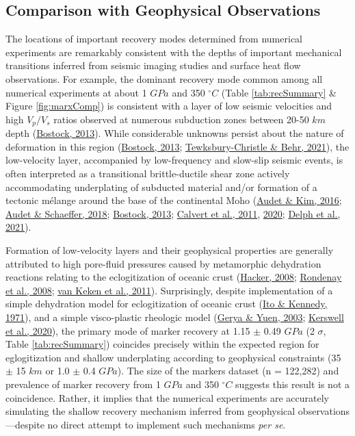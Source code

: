 \hypertarget{geophysComp}{%
\subsection{Comparison with Geophysical Observations}\label{geophysComp}}

The locations of important recovery modes determined from numerical experiments are remarkably consistent with the depths of important mechanical transitions inferred from seismic imaging studies and surface heat flow observations. For example, the dominant recovery mode common among all numerical experiments at about 1 \(GPa\) and 350 \(^\circ C\) (Table \ref{tab:recSummary} \& Figure \ref{fig:marxComp}) is consistent with a layer of low seismic velocities and high \(V_p/V_s\) ratios observed at numerous subduction zones between 20-50 \(km\) depth (\protect\hyperlink{ref-bostock2013}{Bostock, 2013}). While considerable unknowns persist about the nature of deformation in this region (\protect\hyperlink{ref-bostock2013}{Bostock, 2013}; \protect\hyperlink{ref-tewksbury2021b}{Tewksbury-Christle \& Behr, 2021}), the low-velocity layer, accompanied by low-frequency and slow-slip seismic events, is often interpreted as a transitional brittle-ductile shear zone actively accommodating underplating of subducted material and/or formation of a tectonic mélange around the base of the continental Moho (\protect\hyperlink{ref-audet2016}{Audet \& Kim, 2016}; \protect\hyperlink{ref-audet2018}{Audet \& Schaeffer, 2018}; \protect\hyperlink{ref-bostock2013}{Bostock, 2013}; \protect\hyperlink{ref-calvert2011}{Calvert et al., 2011}, \protect\hyperlink{ref-calvert2020}{2020}; \protect\hyperlink{ref-delph2021}{Delph et al., 2021}).

Formation of low-velocity layers and their geophysical properties are generally attributed to high pore-fluid pressures caused by metamorphic dehydration reactions relating to the eclogitization of oceanic crust (\protect\hyperlink{ref-hacker2008}{Hacker, 2008}; \protect\hyperlink{ref-rondenay2008}{Rondenay et al., 2008}; \protect\hyperlink{ref-vankeken2011}{van Keken et al., 2011}). Surprisingly, despite implementation of a simple dehydration model for eclogitization of oceanic crust (\protect\hyperlink{ref-ito1971}{Ito \& Kennedy, 1971}), and a simple visco-plastic rheologic model (\protect\hyperlink{ref-gerya2003}{Gerya \& Yuen, 2003}; \protect\hyperlink{ref-kerswell2020}{Kerswell et al., 2020}), the primary mode of marker recovery at 1.15 \(\pm\) 0.49 \(GPa\) (2 \(\sigma\), Table \ref{tab:recSummary}) coincides precisely within the expected region for eglogitization and shallow underplating according to geophysical constraints (35 \(\pm\) 15 \(km\) or 1.0 \(\pm\) 0.4 \(GPa\)). The size of the markers dataset (n = 122,282) and prevalence of marker recovery from 1 \(GPa\) and 350 \(^\circ C\) suggests this result is not a coincidence. Rather, it implies that the numerical experiments are accurately simulating the shallow recovery mechanism inferred from geophysical observations---despite no direct attempt to implement such mechanisms \emph{per se}.

